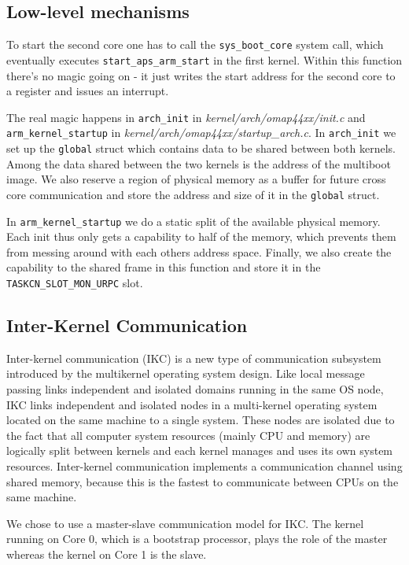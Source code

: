 \documentclass[a4paper,10pt]{article}
\newcommand{\filepath}[1]{\emph{ #1}}
\begin{document}
\subsection{Low-level mechanisms}
\label{sec:low-level-mechanisms}

To start the second core one has to call the \lstinline!sys_boot_core! system call, which eventually executes \lstinline!start_aps_arm_start! in the first kernel.
Within this function there's no magic going on - it just writes the start address for the second core to a register and issues an interrupt.

The real magic happens in \lstinline!arch_init! in \filepath{kernel/arch/omap44xx/init.c} and  \lstinline{arm_kernel_startup} in \filepath{kernel/arch/omap44xx/startup\_arch.c}.
In \lstinline!arch_init! we set up the \lstinline!global! struct which contains data to be shared between both kernels.
Among the data shared between the two kernels is the address of the multiboot image.
We also reserve a region of physical memory as a buffer for future cross core communication and store the address and size of it in the \lstinline!global! struct.

In \lstinline!arm_kernel_startup! we do a static split of the available physical memory.
Each init thus only gets a capability to half of the memory, which prevents them from messing around with each others address space.
Finally, we also create the capability to the shared frame in this function and store it in the \lstinline!TASKCN_SLOT_MON_URPC! slot.

\subsection{Inter-Kernel Communication}
	Inter-kernel communication (IKC) is a new type of communication subsystem introduced by the multikernel operating system design.
	Like local message passing links independent and isolated domains running in the same OS node, IKC links independent and isolated nodes in a multi-kernel operating system located on the same machine to a single system.
	These nodes are isolated due to the fact that all computer system resources (mainly CPU and memory) are logically split between kernels and each kernel manages and uses its own system resources. 
	Inter-kernel communication implements a communication channel using shared memory, because this is the fastest to communicate between CPUs on the same machine.
	
	We chose to use a master-slave communication model for IKC. 
	The kernel running on Core 0,
	which is a bootstrap processor, plays the role of the master whereas the kernel on Core 1 is the slave.
	
\end{document}
